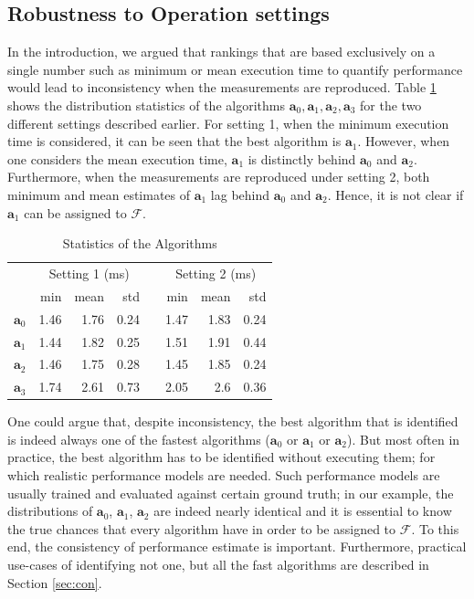 \documentclass[conference]{IEEEtran}
\begin{document}
\subsection{Robustness to Operation settings}

In the introduction, we argued that rankings that are based exclusively on a single number such as minimum or mean execution time to quantify performance would lead to inconsistency when the measurements are reproduced. Table \ref{tab:2} shows the distribution statistics of the algorithms $\mathbf{a}_0, \mathbf{a}_1, \mathbf{a}_2, \mathbf{a}_3$ for the two different settings described earlier. For setting 1,  when the minimum execution time is considered, it can be seen that the best algorithm is $\mathbf{a}_1$. However, when one considers the mean execution time, $\mathbf{a}_1$ is distinctly behind $\mathbf{a}_0$ and $\mathbf{a}_2$. Furthermore, when the measurements are reproduced under setting 2,  both minimum and mean estimates of $\mathbf{a}_1$ lag behind $\mathbf{a}_0$ and $\mathbf{a}_2$. Hence, it is not clear if $\mathbf{a}_1$ can be assigned to $\mathcal{F}$.
\begin{table}[h!]
	\begin{center}
		\renewcommand{\arraystretch}{1.2}
		\begin{tabular}{@{}r rrr c rrr@{}}
			\toprule
			& \multicolumn{3}{c}{Setting 1 (ms)} & & \multicolumn{3}{c}{Setting 2 (ms)} \\
			\cmidrule{2-4} \cmidrule{6-8}
			& min & mean & std && min & mean & std \\
			\midrule
			{$\mathbf{a}_0$ \hfill }& 1.46  & 1.76  & 0.24  && 1.47  & 1.83  & 0.24  \\
			{$\mathbf{a}_1$ } & 1.44  & 1.82   & 0.25  && 1.51  & 1.91   & 0.44  \\
			{$\mathbf{a}_2$ } & 1.46  & 1.75  & 0.28  && 1.45  & 1.85  & 0.24  \\
			{$\mathbf{a}_3$ } & 1.74  & 2.61  & 0.73  && 2.05  & 2.6  & 0.36  \\
			\bottomrule
		\end{tabular}
		\caption{Statistics of the Algorithms}
		\label{tab:2}
	\end{center}
\end{table}

One could argue that, despite inconsistency, the best algorithm that is identified is indeed always one of the fastest algorithms ($\mathbf{a}_0$ or $\mathbf{a}_1$ or $\mathbf{a}_2$). But most often in practice, the best algorithm has to be identified without executing them; for which realistic performance models are needed. Such performance models are usually trained and evaluated against certain ground truth; in our example, the distributions of $\mathbf{a}_0$, $\mathbf{a}_1$, $\mathbf{a}_2$ are indeed nearly identical and it is essential to know the true chances that every algorithm have in order to be assigned to $\mathcal{F}$. To this end, the consistency of performance estimate is important. Furthermore, practical use-cases of identifying not one, but all the fast algorithms are described in Section \ref{sec:con}. 
 
\end{document}
